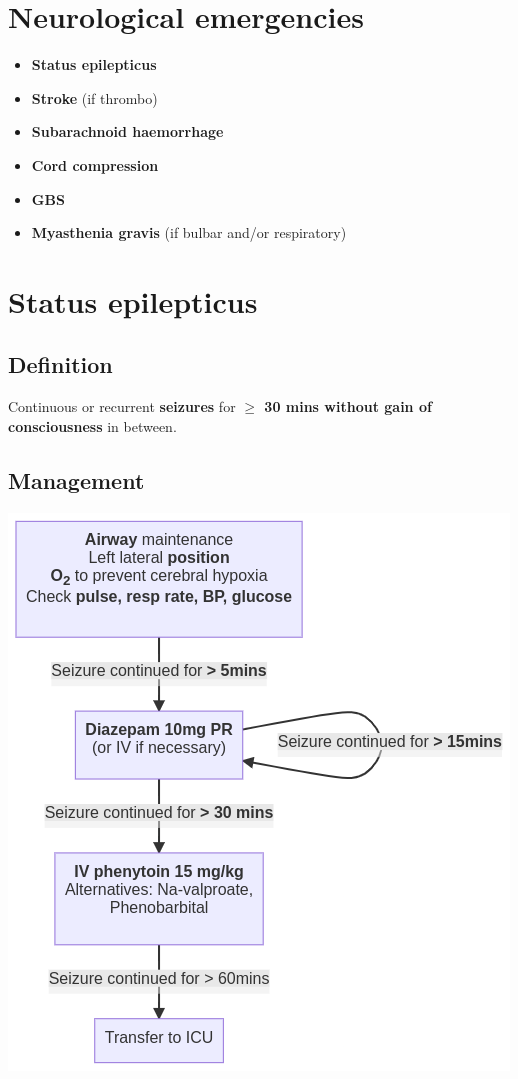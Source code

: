 \documentclass[
  12pt,
]{memoir}
\providecommand{\tightlist}{%
  \setlength{\itemsep}{0pt}\setlength{\parskip}{0pt}}
\begin{document}
\hypertarget{neurological-emergencies}{%
\section{Neurological emergencies}\label{neurological-emergencies}}

\begin{itemize}
\tightlist
\item
  \textbf{Status epilepticus}
\item
  \textbf{Stroke} (if thrombo)
\item
  \textbf{Subarachnoid haemorrhage}
\item
  \textbf{Cord compression}
\item
  \textbf{GBS}
\item
  \textbf{Myasthenia gravis} (if bulbar and/or respiratory)
\end{itemize}

\pagebreak

\hypertarget{status-epilepticus}{%
\section{Status epilepticus}\label{status-epilepticus}}

\hypertarget{definition-1}{%
\subsection{Definition}\label{definition-1}}

Continuous or recurrent \textbf{seizures} for \textbf{\(\ge\) 30 mins
without gain of consciousness} in between.

\hypertarget{management-2}{%
\subsection{Management}\label{management-2}}

\includegraphics[width=.7\textwidth]{../assets/stat-epi.png}
\end{document}
